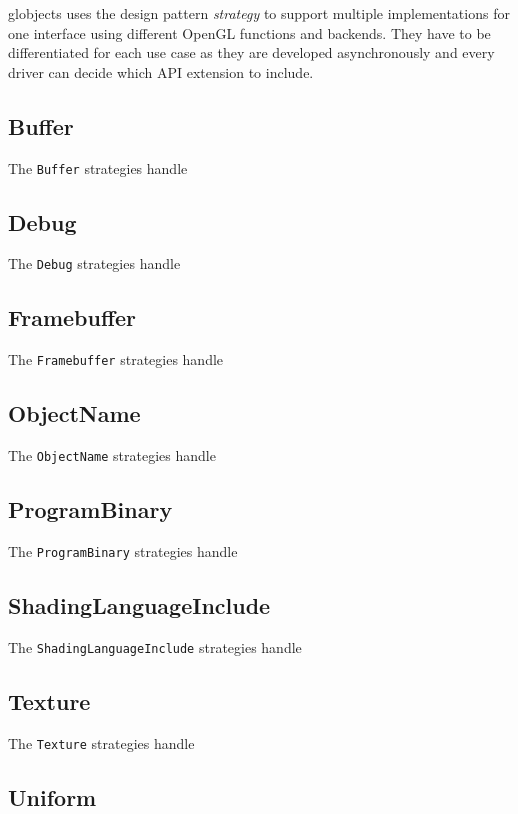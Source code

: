 \documentclass{article}
\begin{document}
globjects uses the design pattern \emph{strategy} to support multiple implementations for one interface using different OpenGL functions and backends. They have to be differentiated for each use case as they are developed asynchronously and every driver can decide which API extension to include.

\subsection{Buffer}

The \lstinline|Buffer| strategies handle

\subsection{Debug}

The \lstinline|Debug| strategies handle

\subsection{Framebuffer}

The \lstinline|Framebuffer| strategies handle

\subsection{ObjectName}

The \lstinline|ObjectName| strategies handle

\subsection{ProgramBinary}

The \lstinline|ProgramBinary| strategies handle

\subsection{ShadingLanguageInclude}

The \lstinline|ShadingLanguageInclude| strategies handle

\subsection{Texture}

The \lstinline|Texture| strategies handle

\subsection{Uniform}
\end{document}
